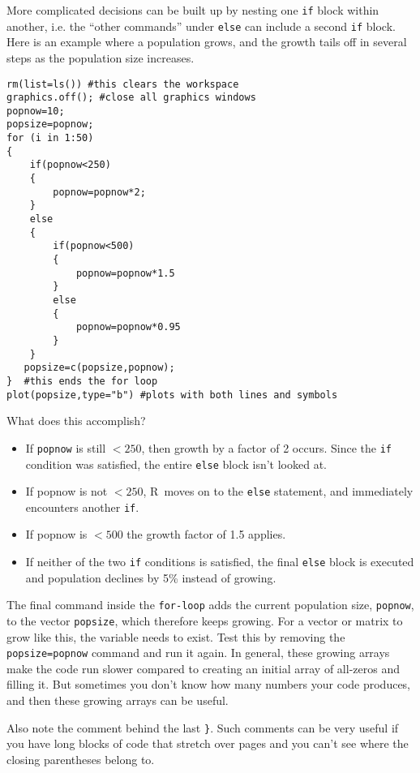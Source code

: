 \documentclass [11pt]{article}
\newcommand{\code}[1]{{\tt #1}}
\newcommand\R{{\sf R}}
\numberwithin{exercise}{section}
\begin{document}
More complicated decisions can be built up by nesting
one \texttt{if} block within another, i.e. the ``other commands''
under \texttt{else} can include a second \texttt{if} block.   
Here is an example where a population grows, and the growth tails off in several steps as the population size increases. 
\begin{verbatim}
rm(list=ls()) #this clears the workspace 
graphics.off(); #close all graphics windows
popnow=10;
popsize=popnow;
for (i in 1:50) 
{                    
    if(popnow<250)
    {
        popnow=popnow*2;             
    }
    else
    {                            
        if(popnow<500)
        {              
            popnow=popnow*1.5        
        }
        else
        {                       
            popnow=popnow*0.95       
        }                             
    }                                
   popsize=c(popsize,popnow);      
}  #this ends the for loop                                 
plot(popsize,type="b") #plots with both lines and symbols
\end{verbatim}

What does this accomplish? \begin{itemize}
\item If \texttt{popnow} is still $<250$, then  growth by a factor of 2 occurs. Since the \texttt{if} condition was 
satisfied, the entire \texttt{else} block isn't looked at. 
\item If popnow is not $<250$, \R\ moves on to the \texttt{else} statement, and immediately encounters another \texttt{if}. 
\item If popnow is $<500$ the growth factor of 1.5 applies. 
\item If neither of the two \texttt{if} conditions is satisfied, the final \texttt{else} block is executed and population declines by 
5{\%} instead of growing. 
\end{itemize} 

The final command inside the \code{for-loop} adds the current population size, \code{popnow}, to the vector \code{popsize}, which therefore keeps growing. For a vector or matrix to grow like this, the variable needs to exist. Test this by removing the \code{popsize=popnow} command and run it again. In general, these growing arrays make the code run slower compared to creating an initial array of all-zeros and filling it. But sometimes you don't know how many numbers your code produces, and then these growing arrays can be useful.

Also note the comment behind the last \code{\}}. Such comments can be very useful if you have long blocks of code that stretch over pages and you can't see where the closing parentheses belong to. 
\end{document}
